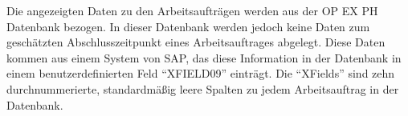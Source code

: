 \noindent Die angezeigten Daten zu den Arbeitsaufträgen werden aus der \gls{OP EX PH} Datenbank bezogen. In dieser Datenbank werden jedoch keine Daten zum geschätzten Abschlusszeitpunkt eines Arbeitsauftrages abgelegt. Diese Daten kommen aus einem System von SAP, das diese Information in der Datenbank in einem benutzerdefinierten Feld \enquote{XFIELD09} einträgt. Die \enquote{XFields} sind zehn durchnummerierte, standardmäßig leere Spalten zu jedem Arbeitsauftrag in der Datenbank.